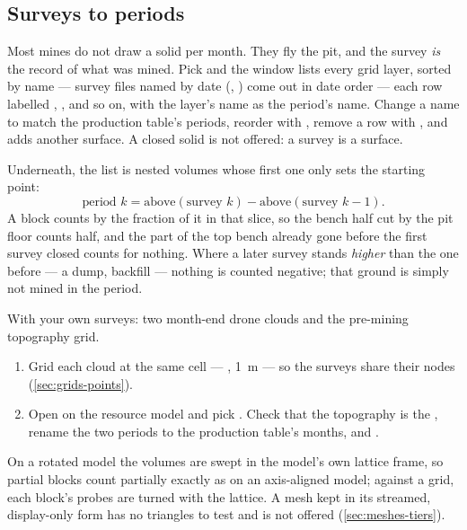 \subsection{Surveys to periods}\label{sec:factors-surveys}
Most mines do not draw a solid per month. They fly the pit, and the survey \emph{is} the record of what was mined. Pick  and the window lists every grid layer, sorted by name — survey files named by date (, ) come out in date order — each row labelled , ,  and so on, with the layer's name as the period's name. Change a name to match the production table's periods, reorder with , remove a row with , and  adds another surface. A closed solid is not offered: a survey is a surface.

Underneath, the list is nested  volumes whose first one only sets the starting point:
\[ \text{period } k = \text{above}(\text{survey } k) - \text{above}(\text{survey } k-1). \]
A block counts by the fraction of it in that slice, so the bench half cut by the pit floor counts half, and the part of the top bench already gone before the first survey closed counts for nothing. Where a later survey stands \emph{higher} than the one before — a dump, backfill — nothing is counted negative; that ground is simply not mined in the period.

\begin{tryit}
With your own surveys: two month-end drone clouds and the pre-mining topography grid.
\begin{enumerate}
\item Grid each cloud at the same cell — ,  1~m — so the surveys share their nodes (\cref{sec:grids-points}).
\item Open  on the resource model and pick . Check that the topography is the , rename the two periods to the production table's months, and .
\end{enumerate}
\end{tryit}

\begin{note}
On a rotated model the volumes are swept in the model's own lattice frame, so partial blocks count partially exactly as on an axis-aligned model; against a grid, each block's probes are turned with the lattice. A mesh kept in its streamed, display-only form has no triangles to test and is not offered (\cref{sec:meshes-tiers}).
\end{note}

